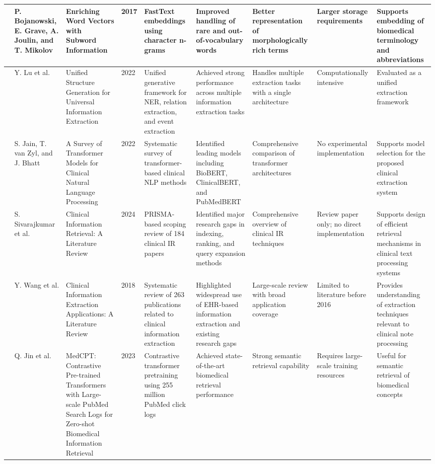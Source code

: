 \begin{landscape}
\begin{singlespace}
\begin{longtable}{|p{0.8cm}|p{1.8cm}|p{3.2cm}|p{0.8cm}|p{3.6cm}|p{3.6cm}|p{2.5cm}|p{2.5cm}|p{3.2cm}|}
\hline
\cite{ref18} & P. Bojanowski, E. Grave, A. Joulin, and T. Mikolov & Enriching Word Vectors with Subword Information & 2017 & FastText embeddings using character n-grams & Improved handling of rare and out-of-vocabulary words & Better representation of morphologically rich terms & Larger storage requirements & Supports embedding of biomedical terminology and abbreviations \\
\hline
\cite{ref19} & Y. Lu et al. & Unified Structure Generation for Universal Information Extraction & 2022 & Unified generative framework for NER, relation extraction, and event extraction & Achieved strong performance across multiple information extraction tasks & Handles multiple extraction tasks with a single architecture & Computationally intensive & Evaluated as a unified extraction framework \\
\hline
\cite{ref20} & S. Jain, T. van Zyl, and J. Bhatt & A Survey of Transformer Models for Clinical Natural Language Processing & 2022 & Systematic survey of transformer-based clinical NLP methods & Identified leading models including BioBERT, ClinicalBERT, and PubMedBERT & Comprehensive comparison of transformer architectures & No experimental implementation & Supports model selection for the proposed clinical extraction system \\
\hline
\cite{ref21} & S. Sivarajkumar et al. & Clinical Information Retrieval: A Literature Review & 2024 & PRISMA-based scoping review of 184 clinical IR papers & Identified major research gaps in indexing, ranking, and query expansion methods & Comprehensive overview of clinical IR techniques & Review paper only; no direct implementation & Supports design of efficient retrieval mechanisms in clinical text processing systems \\
\hline
\cite{ref22} & Y. Wang et al. & Clinical Information Extraction Applications: A Literature Review & 2018 & Systematic review of 263 publications related to clinical information extraction & Highlighted widespread use of EHR-based information extraction and existing research gaps & Large-scale review with broad application coverage & Limited to literature before 2016 & Provides understanding of extraction techniques relevant to clinical note processing \\
\hline
\cite{ref23} & Q. Jin et al. & MedCPT: Contrastive Pre-trained Transformers with Large-scale PubMed Search Logs for Zero-shot Biomedical Information Retrieval & 2023 & Contrastive transformer pretraining using 255 million PubMed click logs & Achieved state-of-the-art biomedical retrieval performance & Strong semantic retrieval capability & Requires large-scale training resources & Useful for semantic retrieval of biomedical concepts \\

\end{longtable}
\end{singlespace}
\end{landscape}
